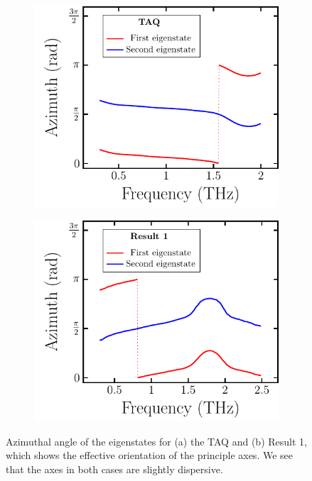 \begin{figure}[H]
    \begin{subfigure}[b]{.5\linewidth}
    \caption{}\label{}
    \centering\includegraphics[scale=0.75]{images/results/plots/ceramic/eigenstate_azimuths_a.pdf}
    \end{subfigure}%
    \begin{subfigure}[b]{.5\linewidth}
    \caption{}\label{}
    \centering\includegraphics[scale=0.75]{images/results/plots/ceramic/eigenstate_azimuths_b.pdf}
    \end{subfigure}
    \caption{Azimuthal angle of the eigenstates for (a) the TAQ and (b) Result 1, which shows the effective orientation of the principle axes. We see that the axes in both cases are slightly dispersive.}
    \label{fig:cl4_eigenstate_azimuths}
\end{figure}

